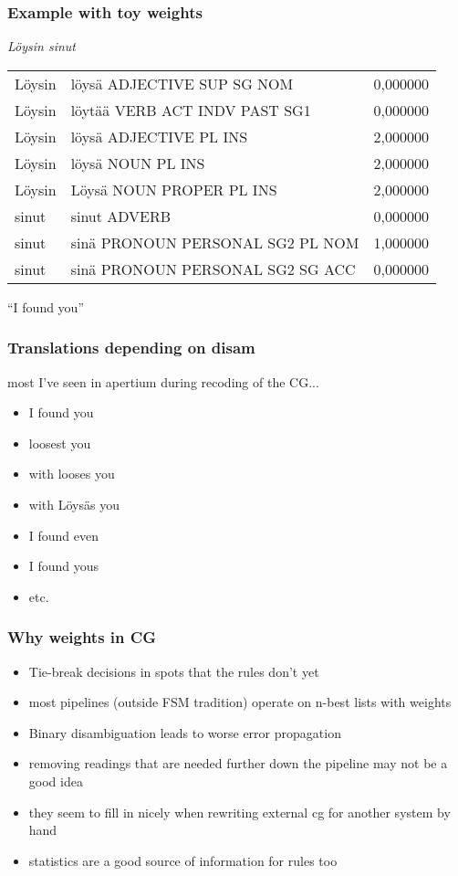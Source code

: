 \documentclass{beamer}
\begin{document}
\begin{frame}
    \frametitle{Example with toy weights}
    \emph{Löysin sinut}
    \begin{tabular}{llr}
        Löysin & löysä ADJECTIVE SUP SG NOM & 0,000000 \\
Löysin & löytää VERB ACT INDV PAST SG1 & 0,000000 \\
Löysin & löysä ADJECTIVE PL INS & 2,000000 \\
Löysin & löysä NOUN PL INS & 2,000000 \\
Löysin & Löysä NOUN PROPER PL INS & 2,000000 \\

sinut & sinut ADVERB & 0,000000 \\
sinut & sinä PRONOUN PERSONAL SG2 PL NOM & 1,000000 \\
sinut & sinä PRONOUN PERSONAL SG2 SG ACC & 0,000000 \\
    \end{tabular}
    ``I found you''
\end{frame}

\begin{frame}
    \frametitle{Translations depending on disam}
    most I've seen in apertium during recoding of the CG...
    \begin{itemize}
        \item I found you
        \item loosest you
        \item with looses you
        \item with Löysäs you
        \item I found even
        \item I found yous
        \item etc.
    \end{itemize}
\end{frame}

\begin{frame}
    \frametitle{Why weights in CG}
    \begin{itemize}
        \item Tie-break decisions in spots that the rules don't yet
        \item most pipelines (outside FSM tradition) operate on n-best
            lists with weights
        \item Binary disambiguation leads to worse error propagation
        \item removing readings that are needed further down the pipeline
            may not be a good idea
        \item they seem to fill in nicely when rewriting external cg for
            another system by hand
        \item statistics are a good source of information for rules too
    \end{itemize}
\end{frame}
\end{document}
